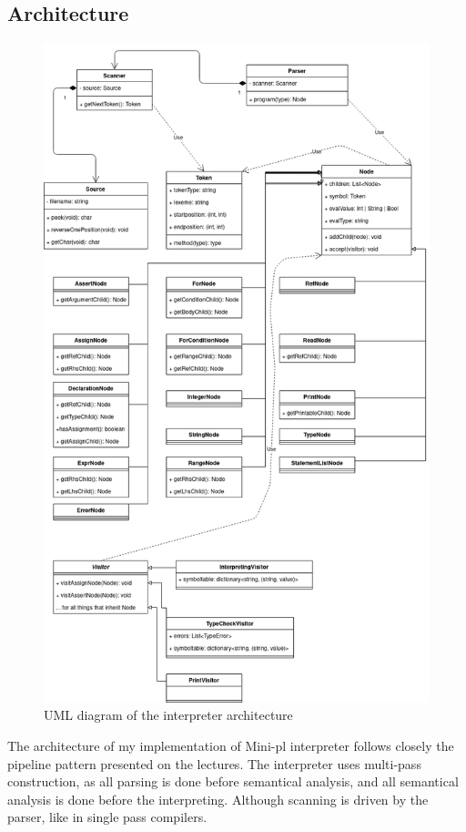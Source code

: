 \documentclass[12pt,a4paper]{article}
\begin{document}
\subsection{Architecture}
\begin{figure}[t]\label{big_uml}
  \caption{UML diagram of the interpreter architecture}
  \includegraphics[scale=0.4]{reportImages/interpreter.png}
\end{figure}
The architecture of my implementation of Mini-pl interpreter
follows closely the pipeline pattern presented on the lectures.
The interpreter uses multi-pass construction, as all
parsing is done before semantical analysis, and all semantical
analysis is done before the interpreting. Although scanning
is driven by the parser, like in single pass compilers.
\end{document}
